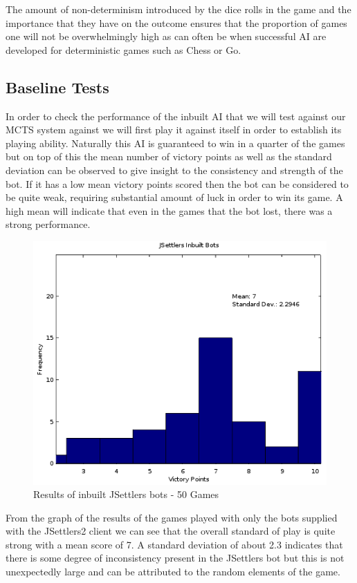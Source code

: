 \documentclass[]{article}
\begin{document}
\par The amount of non-determinism introduced by the dice rolls in the game and the importance that they have on the outcome ensures that the proportion of games one will not be overwhelmingly high as can often be when successful AI are developed for deterministic games such as Chess or Go. 


\subsection{Baseline Tests} 
In order to check the performance of the inbuilt AI that we will test against our MCTS system against we will first play it against itself in order to establish its playing ability. Naturally this AI is guaranteed to win in a quarter of the games but on top of this the mean number of victory points as well as the standard deviation can be observed to give insight to the consistency and strength of the bot. If it has a low mean victory points scored then the bot can be considered to be quite weak, requiring substantial amount of luck in order to win its game. A high mean will indicate that even in the games that the bot lost, there was a strong performance.

\begin{center}
\begin{figure}[H]
 \centerline{\includegraphics[width=0.75\linewidth]{figures/inbuilt.png}}
  \caption{Results of inbuilt JSettlers bots - 50 Games}
  \label{fig:inbuilt} 
\end{figure}
\end{center}

\par From the graph of the results of the games played with only the bots supplied with the JSettlers2 client we can see that the overall standard of play is quite strong with a mean score of 7. A standard deviation of about 2.3 indicates that there is some degree of inconsistency present in the JSettlers bot but this is not unexpectedly large and can be attributed to the random elements of the game.  
\end{document}

